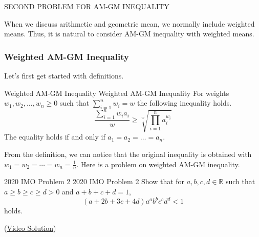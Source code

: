 \documentclass[../main.tex]{subfiles}
\begin{document}
\begin{problem}{}{}
SECOND PROBLEM FOR AM-GM INEQUALITY
\end{problem}

When we discuss arithmetic and geometric mean, we normally
include weighted means. Thus, it is natural to consider AM-GM
inequality with weighted means.

\subsubsection{Weighted AM-GM Inequality}

Let's first get started with definitions.

\begin{definition}
{Weighted AM-GM Inequality}
{Weighted AM-GM Inequality}
For weights $w_1, w_2, \dots, w_n \geq 0$ such that
$\sum_{i=1}^n w_i = w$ the following inequality holds.
\[
\frac{\sum_{i=1}^n w_i a_i}{w}
\geq \sqrt[w]{\prod_{i=1}^n a_i^{w_i}}
\]
The equality holds if and only if $a_1 = a_2 = \dots = a_n$.
\end{definition}

From the definition, we can notice that the original inequality is
obtained with $w_1 = w_2 = \cdots = w_n = \frac{1}{n}$. Here is
a problem on weighted AM-GM inequality.

\begin{problem}
{2020 IMO Problem 2}
{2020 IMO Problem 2}
Show that for $a, b, c, d \in \mathbb{R}$ such that
$a \geq b \geq c \geq d > 0$ and $a + b + c + d = 1$,
\[
(a + 2b + 3c + 4d) a^a b^b c^c d^d < 1
\]
holds.
\end{problem}

(\href{https://youtu.be/Vz9BC5q7zdc}{Video Solution})
\end{document}
